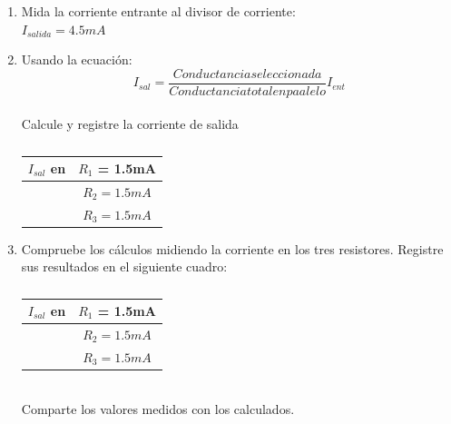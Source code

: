 \begin{enumerate}
\begin{table}[h]
\begin{tabular}{|c|c|}
	\end{tabular}
	\caption{}
\end{table}
\item Mida la corriente entrante al divisor de corriente:\\
$I_{salida}=4.5mA$
	\item Usando la ecuación:
	\begin{equation*}
		I_{sal} = \frac{Conductancia seleccionada}{Conductancia total en paalelo}I_{ent}
	\end{equation*}
	\\ Calcule y registre la corriente de salida 
	
	\begin{table}[h]
		\centering
		\begin{tabular}{|c|c|}
			\hline
			$I_{sal}$ en &$R_{1}$ = 1.5mA\\ \hline
			&$R_{2}=1.5mA$\\ \hline
			&$R_{3}= 1.5mA$\\ \hline			
		\end{tabular}
		\caption{}
	\end{table}
	\item Compruebe los cálculos midiendo la corriente en los tres resistores. Registre sus resultados en el siguiente cuadro:
	\begin{table}[h]
		\centering
		\begin{tabular}{|c|c|}
			\hline
			$I_{sal}$ en &$R_{1}$ = 1.5mA\\ \hline
			&$R_{2}=1.5mA$\\ \hline
			&$R_{3}= 1.5mA$\\ \hline			
		\end{tabular}
		\caption{}
	\end{table}
	\\ Comparte los valores medidos con los calculados.
\end{enumerate}
